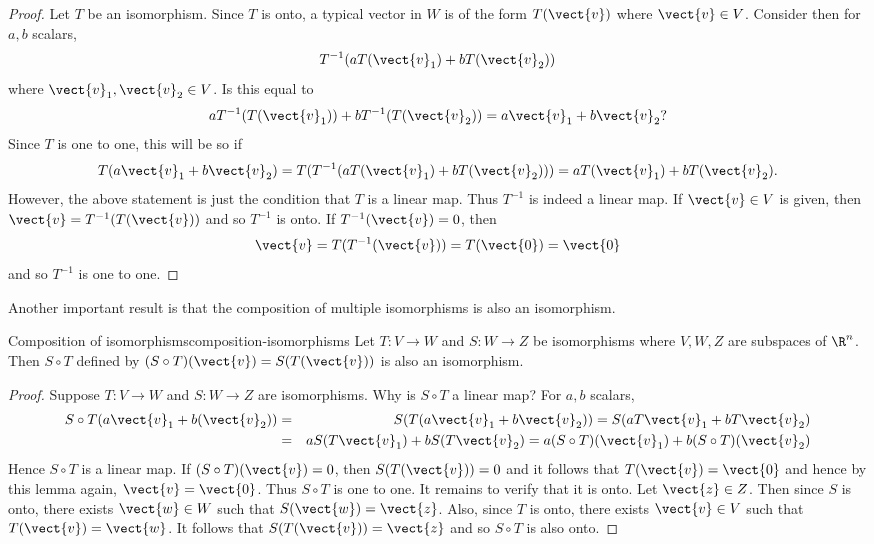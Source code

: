 \begin{proof} Let $T$ be an isomorphism.  Since $T$ is onto, a typical
vector in $W$ is of the form $T(\vect{v})$ where $\vect{v} \in V$. Consider then for $a,b$
scalars, 
\begin{equation*}
T^{-1}(aT(\vect{v}_{1})+bT(\vect{v}_{2}))
\end{equation*}
where $\vect{v}_{1}, \vect{v}_2 \in V$. Is this equal to 
\begin{equation*}
aT^{-1}(T (\vect{v}_{1})) +bT^{-1}(T(\vect{v}_{2})) =a\vect{v}_{1}+b\vect{v}_{2}?
\end{equation*}
Since $T$ is one to one, this will be so if 
\begin{equation*}
T(a\vect{v}_{1}+b\vect{v}_{2}) =T(T^{-1}(aT(\vect{v}_{1})+bT(\vect{v}_{2}))
) =aT(\vect{v}_{1})+bT(\vect{v}_{2}).
\end{equation*}
However, the above statement is just the condition that $T$ is a linear map.
Thus $T^{-1}$ is indeed a linear map. If $\vect{v} \in V$ is given, then $\vect{v}=T^{-1}(T(\vect{v})) $ and so $T^{-1}$ is onto. If $T^{-1} (\vect{v})=0$, then 
\begin{equation*}
\vect{v}=T(T^{-1}(\vect{v})) =T(\vect{0})=\vect{0}
\end{equation*}
and so $T^{-1}$ is one to one.
\end{proof}

Another important result is that the composition of multiple isomorphisms is also an isomorphism.

\begin{proposition}{Composition of isomorphisms}{composition-isomorphisms}
Let $T:V\rightarrow W$ and  $S:W\rightarrow Z$ be isomorphisms where $V,W,Z$ are subspaces of $\R^n$. Then $S\circ
T $ defined by $(S\circ T) (\vect{v}) = S(
T(\vect{v})) $ is also an isomorphism.
\end{proposition}

\begin{proof}
Suppose $T:V\rightarrow W$ and  $S:W\rightarrow Z$ are isomorphisms. Why is $S\circ T$ a linear map?
For $a,b$ scalars,
\begin{eqnarray*}
S\circ T(a\vect{v}_{1}+b(\vect{v}_{2})) 
&=& S(T(a\vect{v}_{1}+b\vect{v}_{2})) =S(aT\vect{v}_{1}+bT\vect{v}_{2}) \\
&=&aS(T\vect{v}_{1}) +bS(T\vect{v}_{2}) = a(S\circ
T) (\vect{v}_{1}) +b(S\circ T) (\vect{v}_{2})
\end{eqnarray*}
Hence $S\circ T$ is a linear map. If $(S\circ T) (\vect{v})
=0$, then $S(T(\vect{v})) =0$ and it follows that $T(\vect{v})=\vect{0}$ and hence by this lemma again, $\vect{v}=\vect{0}$. Thus $S\circ
T $ is one to one. It remains to verify that it is onto. Let $\vect{z} \in Z$. Then
since $S$ is onto, there exists $\vect{w} \in W$ such that $S(\vect{w})=\vect{z}$. Also, since $T$
is onto, there exists $\vect{v}\in V$ such that $T(\vect{v})=\vect{w}$. It follows that $S(
T(\vect{v})) =\vect{z}$ and so $S\circ T$ is also onto.
\end{proof}

